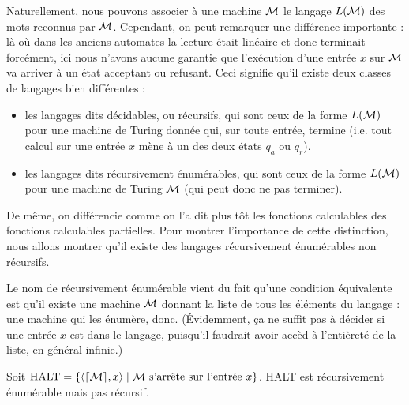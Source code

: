 Naturellement, nous pouvons associer à une machine $\mathcal M$ le langage $L(\mathcal M)$ des mots reconnus par $\mathcal M$. Cependant, on peut remarquer une différence importante : là où dans les anciens automates la lecture était linéaire et donc terminait forcément, ici nous n'avons aucune garantie que l'exécution d'une entrée $x$ sur $\mathcal M$ va arriver à un état acceptant ou refusant. Ceci signifie qu'il existe deux classes de langages bien différentes :
\begin{itemize}[label=$\bullet$]
    \item les langages dits décidables, ou récursifs, qui sont ceux de la forme $L(\mathcal M)$ pour une machine de Turing donnée qui, sur toute entrée, termine (i.e. tout calcul sur une entrée $x$ mène à un des deux états $q_a$ ou $q_r$).
    \item les langages dits récursivement énumérables, qui sont ceux de la forme $L(\mathcal M)$ pour une machine de Turing $\mathcal M$ (qui peut donc ne pas terminer).
\end{itemize}

De même, on différencie comme on l'a dit plus tôt les fonctions calculables des fonctions calculables partielles. Pour montrer l'importance de cette distinction, nous allons montrer qu'il existe des langages récursivement énumérables non récursifs.

\begin{rmk}
    Le nom de \og récursivement énumérable\fg{} vient du fait qu'une condition équivalente est qu'il existe une machine $\mathcal M$ donnant la liste de tous les éléments du langage : une machine qui les énumère, donc. (\'Evidemment, ça ne suffit pas à décider si une entrée $x$ est dans le langage, puisqu'il faudrait avoir accèd à l'entièreté de la liste, en général infinie.)
\end{rmk}

\begin{defi}
    Soit $\mathrm{HALT} = \{\langle \lceil \mathcal M \rceil,x\rangle\mid \mathcal M \text{ s'arrête sur l'entrée } x\}$. HALT est récursivement énumérable mais pas récursif.
\end{defi}

